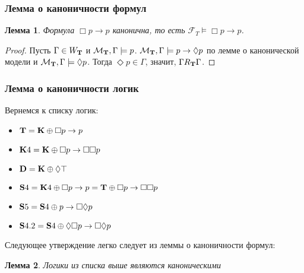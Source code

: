 \documentclass[pdf,utf8,russian,aspectratio=169]{beamer}
\newtheorem{lem}{Лемма}
\begin{document}
\begin{frame}
  \frametitle{Лемма о каноничности формул}

  \begin{lem}
    Формула $\Box p \to p$ канонична, то есть $\mathcal{F}_{T} \models \Box p \to p$.
  \end{lem}

\begin{proof}
  Пусть $\Gamma \in W_{\bf T}$ и $\mathcal{M}_{\bf T}, \Gamma \models p$.
  $\mathcal{M}_{\bf T}, \Gamma \models p \to \Diamond p$ по лемме о канонической модели и
  $\mathcal{M}_{\bf T}, \Gamma \models \Diamond p$.
  Тогда $\Diamond p \in \Gamma$, значит, $\Gamma R_{\bf T} \Gamma$.
\end{proof}
\end{frame}

\begin{frame}
  \frametitle{Лемма о каноничности логик}

Вернемся к списку логик:

  \begin{itemize}
    \item ${\bf T} = {\bf K} \oplus \Box p \to p$
    \item ${\bf K}4 = {\bf K} \oplus \Box p \to \Box \Box p$
    \item ${\bf D} = {\bf K} \oplus \Diamond \top$
    \item ${\bf S}4 = {\bf K}4 \oplus \Box p \to p = {\bf T} \oplus \Box p \to \Box \Box p$
    \item ${\bf S}5 = {\bf S}4 \oplus p \to \Box \Diamond p$
    \item ${\bf S}4.2 = {\bf S}4 \oplus \Diamond \Box p \to \Box \Diamond p$
  \end{itemize}

Следующее утверждение легко следует из леммы о каноничности формул:


\begin{lem}
  Логики из списка выше являются каноническими
\end{lem}

\end{frame}
\end{document}
